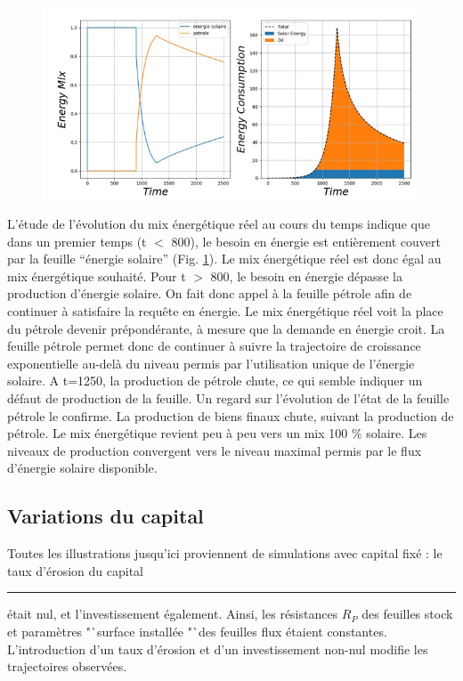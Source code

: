 \documentclass[12pt,a4paper]{article}%
\providecommand{\U}[1]{\protect\rule{.1in}{.1in}}
\begin{document}
\begin{figure}[h]
\centering
\includegraphics[width=1.0\textwidth]{figures/Energie12.jpg}\label{Fig12}\end{figure}

L'étude de l'évolution du mix énergétique réel au cours du temps indique que
dans un premier temps (t%
$<$%
800), le besoin en énergie est entièrement couvert par la feuille
"`énergie solaire"' (Fig. \ref{Fig12}). Le mix énergétique réel est donc égal
au mix énergétique souhaité. Pour t%
$>$%
800, le besoin en énergie dépasse la production d'énergie solaire. On fait
donc appel à la feuille pétrole afin de continuer à satisfaire la
requête en énergie. Le mix énergétique réel voit la place du pétrole devenir
prépondérante, à mesure que la demande en énergie croit. La feuille
pétrole permet donc de continuer à suivre la trajectoire de croissance
exponentielle au-delà du niveau permis par l'utilisation unique de
l'énergie solaire. A t=1250, la production de pétrole chute, ce qui semble
indiquer un défaut de production de la feuille. Un regard sur l'évolution de
l'état de la feuille pétrole le confirme. La production de biens finaux chute,
suivant la production de pétrole. Le mix énergétique revient peu à peu
vers un mix 100 \% solaire. Les niveaux de production convergent vers le
niveau maximal permis par le flux d'énergie solaire disponible.

\subsection{Variations du capital}

Toutes les illustrations jusqu'ici proviennent de simulations avec capital
fixé : le taux d'érosion du capital \U{3b4} était nul, et l'investissement
également. Ainsi, les résistances $R_{P}$ des feuilles stock et paramètres
"`surface installée "`des feuilles flux étaient constantes. L'introduction
d'un taux d'érosion et d'un investissement non-nul modifie les trajectoires observées.
\end{document}
